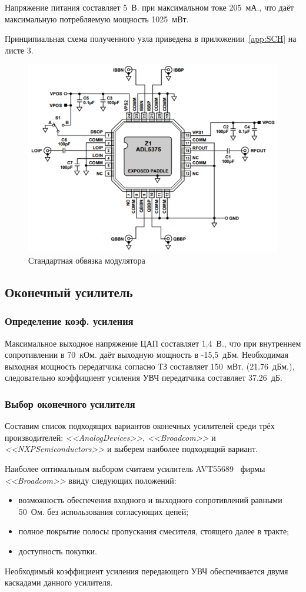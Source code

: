 \documentclass[utf8x, 14pt, oneside, a4paper]{article}
\begin{document}
				Напряжение питания составляет 5~В. при максимальном токе 205~мА., что даёт максимальную потребляемую мощность 1025~мВт.
				
				Принципиальная схема полученного узла приведена в приложении~\ref{app:SCH} на листе 3.
				\begin{figure}[h!]
					\centering
					\includegraphics[width=0.7\linewidth]{"Обвязка модулятора"}
					\caption{Стандартная обвязка модулятора}
					\label{fig:обвязка:ПовышающийСмеситель}
				\end{figure}
			
		\subsection{Оконечный усилитель}
			\subsubsection{Определение коэф. усиления}
				Максимальное выходное напряжение ЦАП составляет 1.4~В., что при внутреннем сопротивлении в 70~кОм. даёт выходную мощность в -15,5~дБм. Необходимая выходная мощность передатчика согласно ТЗ составляет 150~мВт. (21.76~дБм.), следовательно коэффициент усиления УВЧ передатчика составляет 37.26~дБ.
			\subsubsection{Выбор оконечного усилителя}
				Составим список подходящих вариантов оконечных усилителей среди трёх производителей: \textit{<<AnalogDevices>>}, \textit{<<Broadcom>>} и \textit{<<NXPSemiconductors>>} и выберем наиболее подходящий вариант.
				
				
				
				Наиболее оптимальным выбором считаем усилитель AVT55689~\cite{bib:ОконечныйУсилитель} фирмы \textit{<<Broadcom>>} ввиду следующих положений:
				\begin{itemize}
					\item возможность обеспечения входного и выходного сопротивлений равными 50~Ом. без использования согласующих цепей;
					\item полное покрытие полосы пропускания смесителя, стоящего далее в тракте;
					\item доступность покупки.
				\end{itemize}
				Необходимый коэффициент усиления передающего УВЧ обеспечивается двумя каскадами данного усилителя.
			
\end{document}
